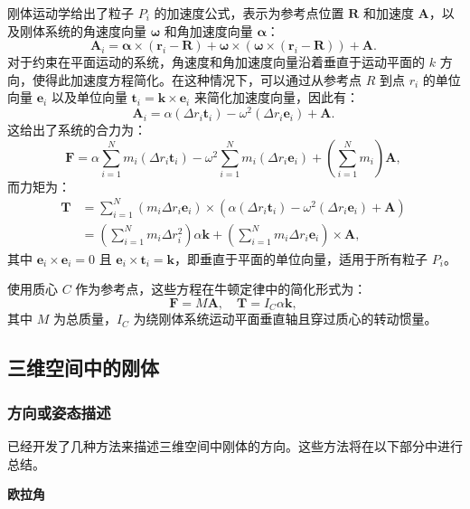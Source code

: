 刚体运动学给出了粒子 \( P_i \) 的加速度公式，表示为参考点位置 \( \mathbf{R} \) 和加速度 \( \mathbf{A} \)，以及刚体系统的角速度向量 \( \boldsymbol{\omega} \) 和角加速度向量 \( \boldsymbol{\alpha} \)：
\[
\mathbf{A}_i = \boldsymbol{\alpha} \times (\mathbf{r}_i - \mathbf{R}) + \boldsymbol{\omega} \times (\boldsymbol{\omega} \times (\mathbf{r}_i - \mathbf{R})) + \mathbf{A}.~
\]
对于约束在平面运动的系统，角速度和角加速度向量沿着垂直于运动平面的 \( k \) 方向，使得此加速度方程简化。在这种情况下，可以通过从参考点 \( R \) 到点 \( r_i \) 的单位向量 \( \mathbf{e}_i \) 以及单位向量 \( \mathbf{t}_i = \mathbf{k} \times \mathbf{e}_i \) 来简化加速度向量，因此有：
\[
\mathbf{A}_i = \alpha (\Delta r_i \mathbf{t}_i) - \omega^2 (\Delta r_i \mathbf{e}_i) + \mathbf{A}.~
\]
这给出了系统的合力为：
\[
\mathbf{F} = \alpha \sum_{i=1}^{N} m_{i} \left( \Delta r_{i} \mathbf{t}_{i} \right) - \omega^2 \sum_{i=1}^{N} m_{i} \left( \Delta r_{i} \mathbf{e}_{i} \right) + \left( \sum_{i=1}^{N} m_{i} \right) \mathbf{A},~
\]
而力矩为：
\begin{equation}
\begin{aligned}
\mathbf{T} &= \sum_{i=1}^{N} (m_{i} \Delta r_{i} \mathbf{e}_{i}) \times \left( \alpha (\Delta r_{i} \mathbf{t}_{i}) - \omega^2 (\Delta r_{i} \mathbf{e}_{i}) + \mathbf{A} \right) \\
&= \left( \sum_{i=1}^{N} m_{i} \Delta r_{i}^{2} \right) \alpha \mathbf{k} + \left( \sum_{i=1}^{N} m_{i} \Delta r_{i} \mathbf{e}_{i} \right) \times \mathbf{A},
\end{aligned}~
\end{equation}
其中 \( \mathbf{e}_{i} \times \mathbf{e}_{i} = 0 \) 且 \( \mathbf{e}_{i} \times \mathbf{t}_{i} = \mathbf{k} \)，即垂直于平面的单位向量，适用于所有粒子 \( P_i \)。

使用质心 \( C \) 作为参考点，这些方程在牛顿定律中的简化形式为：
\[
\mathbf{F} = M \mathbf{A}, \quad \mathbf{T} = I_C \alpha \mathbf{k},~
\]
其中 \( M \) 为总质量，\( I_C \) 为绕刚体系统运动平面垂直轴且穿过质心的转动惯量。
\subsection{三维空间中的刚体}
\subsubsection{方向或姿态描述}    
已经开发了几种方法来描述三维空间中刚体的方向。这些方法将在以下部分中进行总结。

\textbf{欧拉角}  

